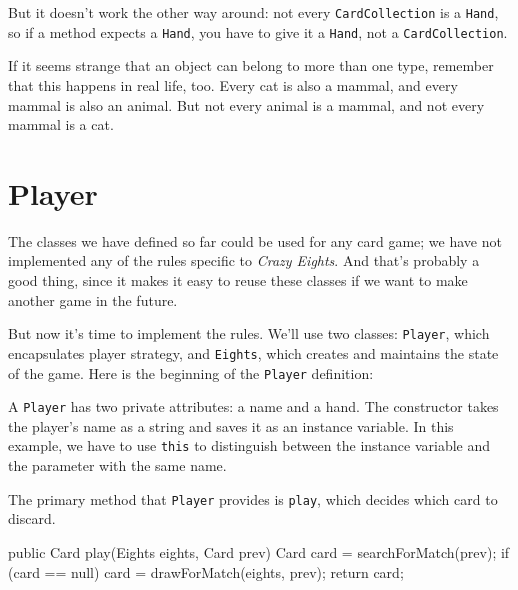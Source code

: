 \documentclass[12pt]{book}
\theoremstyle{exercise}
\newcommand{\java}[1]{\verb"#1"}
\begin{document}
But it doesn't work the other way around: not every \java{CardCollection} is a \java{Hand}, so if a method expects a \java{Hand}, you have to give it a \java{Hand}, not a \java{CardCollection}.

If it seems strange that an object can belong to more than one type, remember that this happens in real life, too.
Every cat is also a mammal, and every mammal is also an animal.
But not every animal is a mammal, and not every mammal is a cat.




\section{Player}

The classes we have defined so far could be used for any card game; we have not implemented any of the rules specific to {\em Crazy Eights}.
And that's probably a good thing, since it makes it easy to reuse these classes if we want to make another game in the future.

But now it's time to implement the rules.
We'll use two classes: \java{Player}, which encapsulates player strategy, and \java{Eights}, which creates and maintains the state of the game.
Here is the beginning of the \java{Player} definition:

\begin{code}
public class Player {

    private String name;
    private Hand hand;

    public Player(String name) {
        this.name = name;
        this.hand = new Hand(name);
    }
\end{code}

A \java{Player} has two private attributes: a name and a hand.
The constructor takes the player's name as a string and saves it as an instance variable.
In this example, we have to use \java{this} to distinguish between the instance variable and the parameter with the same name.

The primary method that \java{Player} provides is \java{play}, which decides which card to discard.

\begin{code}
    public Card play(Eights eights, Card prev) {
        Card card = searchForMatch(prev);
        if (card == null) {
            card = drawForMatch(eights, prev);
        }
        return card;
    }
\end{code}
\end{document}
